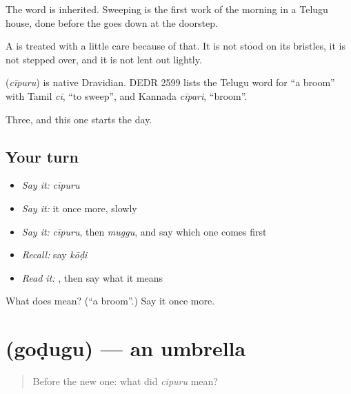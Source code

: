 The word is inherited. Sweeping is the first work of the morning in a Telugu house, done before the  goes down at the doorstep.

A  is treated with a little care because of that. It is not stood on its bristles, it is not stepped over, and it is not lent out lightly.

\begin{cousinweb}
\textbf{} (\emph{cīpuru}) is native Dravidian. DEDR 2599 lists the Telugu word for \textquotedblleft{}a broom\textquotedblright{} with Tamil \emph{cī}, \textquotedblleft{}to sweep\textquotedblright{}, and Kannada \emph{cīpari}, \textquotedblleft{}broom\textquotedblright{}.
\end{cousinweb}

\begin{grammarlens}[title={What you've built}]
Three, and this one starts the day.
\end{grammarlens}

\subsection*{Your turn}
\begin{itemize}
\raggedright
  \item \emph{Say it:} \emph{cīpuru}
  \item \emph{Say it:} it once more, slowly
  \item \emph{Say it:} \emph{cīpuru}, then \emph{muggu}, and say which one comes first
  \item \emph{Recall:} say \emph{kōḍi}
  \item \emph{Read it:} \textbf{}, then say what it means
\end{itemize}

\begin{tcolorbox}[breakable,colback=teal!4,colframe=teal!35!black,title={Before you move on}]
What does  mean? (\textquotedblleft{}a broom\textquotedblright{}.) Say it once more.
\end{tcolorbox}
\section[\texorpdfstring{\te{గొడుగు} (goḍugu)}{గొడుగు (goḍugu)}]{ (goḍugu) — an umbrella}

\label{lesson:TE-C62-umbrella}



\begin{quote}
Before the new one: what did \emph{cīpuru} mean?
\end{quote}

